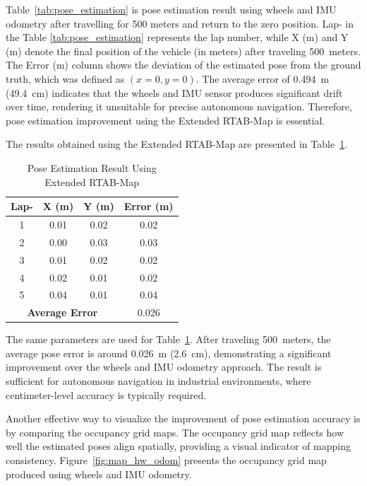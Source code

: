 \documentclass[conference, a4paper]{IEEEtran}[2015/08/26]
\begin{document}
Table~\ref{tab:pose_estimation} is pose estimation result using wheels and IMU odometry after travelling for 500 meters and return to the zero position. Lap- in the Table \ref{tab:pose_estimation} represents the lap number, while X (m) and Y (m) denote the final position of the vehicle (in meters) after traveling 500~meters. The Error (m) column shows the deviation of the estimated pose from the ground truth, which was defined as $(x=0, y=0)$. The average error of 0.494~m (49.4~cm) indicates that the wheels and IMU sensor produces significant drift over time, rendering it unsuitable for precise autonomous navigation. Therefore, pose estimation improvement using the Extended RTAB-Map is essential.

\par
The results obtained using the Extended RTAB-Map are presented in Table~\ref{tab:pose_estimation_slam}.

\begin{table}[H]
	\centering
	\caption{Pose Estimation Result Using Extended RTAB-Map}
	\label{tab:pose_estimation_slam}
	\begin{tabular}{|c|c|c|c|}
		\hline
		\textbf{Lap-} & \textbf{X (m)} & \textbf{Y (m)} & \textbf{Error (m)} \\ \hline
		1 & 0.01 & 0.02 & 0.02 \\ \hline
		2 & 0.00 & 0.03 & 0.03 \\ \hline
		3 & 0.01 & 0.02 & 0.02 \\ \hline
		4 & 0.02 & 0.01 & 0.02 \\ \hline
		5 & 0.04 & 0.01 & 0.04 \\ \hline
		\multicolumn{3}{|c|}{\textbf{Average Error}} & 0.026 \\ \hline
	\end{tabular}
\end{table}

The same parameters are used for Table~\ref{tab:pose_estimation_slam}. After traveling 500~meters, the average pose error is around 0.026~m (2.6~cm), demonstrating a significant improvement over the wheels and IMU odometry approach. The result is sufficient for autonomous navigation in industrial environments, where centimeter-level accuracy is typically required.

\par
Another effective way to visualize the improvement of pose estimation accuracy is by comparing the occupancy grid maps. The occupancy grid map reflects how well the estimated poses align spatially, providing a visual indicator of mapping consistency. Figure~\ref{fig:map_hw_odom} presents the occupancy grid map produced using wheels and IMU odometry.
\end{document}
